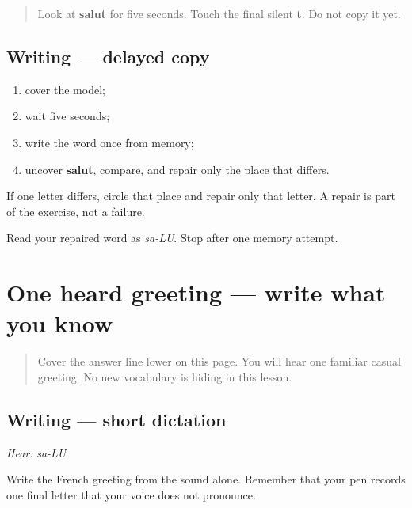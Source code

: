 \label{lesson:FR-W01-salut-delayed-copy}



\begin{quote}
Look at \textbf{salut} for five seconds. Touch the final silent \textbf{t}. Do not copy it yet.
\end{quote}

\subsection*{Writing — delayed copy}

\begin{enumerate}
\raggedright
  \item cover the model;
  \item wait five seconds;
  \item write the word once from memory;
  \item uncover \textbf{salut}, compare, and repair only the place that differs.
\end{enumerate}

If one letter differs, circle that place and repair only that letter. A repair is part of the exercise, not a failure.

\begin{tcolorbox}[breakable,colback=teal!4,colframe=teal!35!black,title={Before you move on}]
Read your repaired word as \emph{sa-LU}. Stop after one memory attempt.
\end{tcolorbox}
\section[salut]{One heard greeting — write what you know}

\label{lesson:FR-W01-salut-dictation}



\begin{quote}
Cover the answer line lower on this page. You will hear one familiar casual greeting. No new vocabulary is hiding in this lesson.
\end{quote}

\subsection*{Writing — short dictation}
\emph{Hear:} \emph{sa-LU}

Write the French greeting from the sound alone. Remember that your pen records one final letter that your voice does not pronounce.

